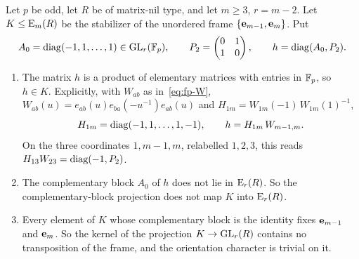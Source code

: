 \begin{proposition}\label{prop:unordered-fails}
Let $p$ be odd, let $R$ be of matrix-nil type, and let $m\geq3$, $r=m-2$. Let $K\leq\operatorname{E}_m(R)$ be the stabilizer of the
unordered frame $\{\mathbf e_{m-1},\mathbf e_m\}$. Put
\[
 A_0=\operatorname{diag}(-1,1,\dots,1)\in\operatorname{GL}_r(\mathbb F_p),\qquad P_2=\begin{pmatrix}0&1\\1&0\end{pmatrix},\qquad
 h=\operatorname{diag}(A_0,P_2).
\]
\begin{enumerate}[label=\textup{(\roman*)}]
\item The matrix $h$ is a product of elementary matrices with entries in $\mathbb F_p$, so $h\in K$. Explicitly, with $W_{ab}$
as in~\eqref{eq:fp-W}, $W_{ab}(u)=e_{ab}(u)e_{ba}(-u^{-1})e_{ab}(u)$ and $H_{1m}=W_{1m}(-1)\,W_{1m}(1)^{-1}$,
\[
 H_{1m}=\operatorname{diag}(-1,1,\dots,1,-1),\qquad h=H_{1m}\,W_{m-1,m}.
\]
On the three coordinates $1,m-1,m$, relabelled $1,2,3$, this reads $H_{13}W_{23}=\operatorname{diag}(-1,P_2)$.
\item The complementary block $A_0$ of $h$ does not lie in $\operatorname{E}_r(R)$. So the complementary-block projection does not
map $K$ into $\operatorname{E}_r(R)$.
\item Every element of $K$ whose complementary block is the identity fixes $\mathbf e_{m-1}$ and $\mathbf e_m$. So the kernel of
the projection $K\to\operatorname{GL}_r(R)$ contains no transposition of the frame, and the orientation character is trivial on it.
\end{enumerate}
\end{proposition}

